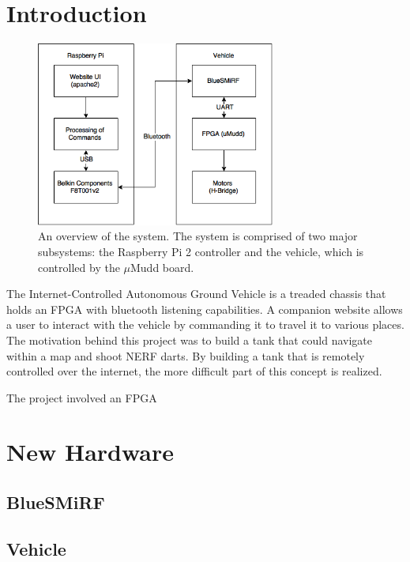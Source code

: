 \documentclass[12pt]{article}
\begin{document}
\newpage


\section{Introduction}

\begin{figure}[b!]
\begin{center}
\includegraphics[width=0.7\textwidth]{E155System}
\end{center}
\caption{An overview of the system. The system is comprised of two major subsystems: the Raspberry Pi 2 controller and the vehicle, which is controlled by the $\mu$Mudd board.}
\label{fig:sys}
\end{figure}

The Internet-Controlled Autonomous Ground Vehicle is a treaded chassis that holds an FPGA with bluetooth listening capabilities. A companion website allows a user to interact with the vehicle by commanding it to travel it to various places. The motivation behind this project was to build a tank that could navigate within a map and shoot NERF darts. By building a tank that is remotely controlled over the internet, the more difficult part of this concept is realized.

The project involved an FPGA 

\section{New Hardware}
\subsection{BlueSMiRF}
\subsection{Vehicle}
\end{document}
